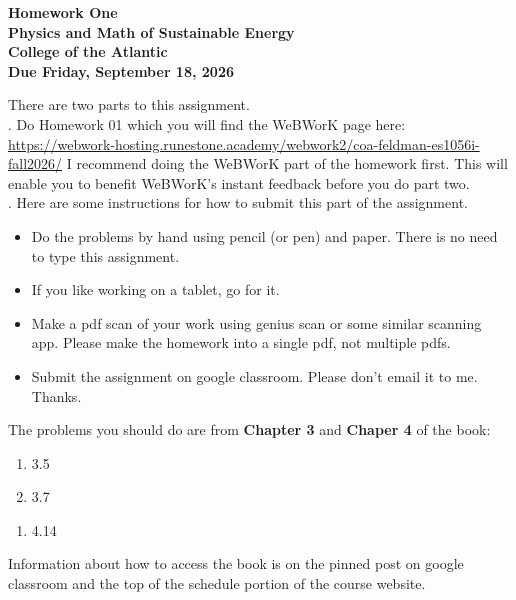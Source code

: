 \documentclass[12pt]{article}
\begin{document}
\pagestyle{empty}
 
\begin{center}
{\LARGE {\bf Homework One}}\\
\bigskip
{\Large {\bf Physics and Math of Sustainable Energy}}\\
\bigskip
{\Large {\bf College of the Atlantic}}\\
\bigskip
{ {\bf Due Friday, September 18, 2026}}\\ 
\end{center}
\medskip


\noindent There are two parts to this assignment.\\

.  Do Homework 01 which you
will find the WeBWorK page here:
\url{https://webwork-hosting.runestone.academy/webwork2/coa-feldman-es1056i-fall2026/}
I recommend doing the WeBWorK part of the homework first. This will
enable you to benefit WeBWorK's instant feedback before you do part
two.\\ 


.  Here are some
instructions for how to submit this part of the assignment.
\begin{itemize}
\item Do the problems by hand using pencil (or pen) and paper.
  There is no need to type this assignment.
\item If you like working on a tablet, go for it. 
\item Make a pdf scan of your work using genius scan or some
  similar scanning app. Please make the homework into a single
  pdf, not multiple pdfs.
\item Submit the assignment on google classroom.  Please don't
  email it to me. Thanks.\\
\end{itemize}

\noindent The problems you should do are from {\bf Chapter 3} and {\bf
  Chaper 4} of the book:  

\begin{enumerate}
\setlength{\itemsep}{-1mm}
  \item 3.5
  \item 3.7\\
\end{enumerate}

\begin{enumerate}
  \setlength{\itemsep}{-1mm}
  \item 4.14
\end{enumerate}

\noindent Information about how to access the book is on the
pinned post on google classroom and the top of the schedule portion of
the course website.  
\end{document}
